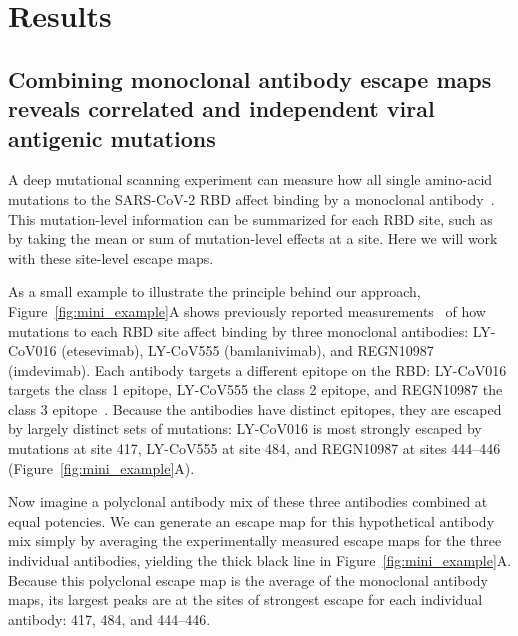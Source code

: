 \documentclass[9pt,twocolumn,twoside]{gsajnl_modified}
\begin{document}
\section{Results}

\subsection{Combining monoclonal antibody escape maps reveals correlated and independent viral antigenic mutations}
A deep mutational scanning experiment can measure how all single amino-acid mutations to the SARS-CoV-2 RBD affect binding by a monoclonal antibody~\citep{greaney2021complete}.
This mutation-level information can be summarized for each RBD site, such as by taking the mean or sum of mutation-level effects at a site.
Here we will work with these site-level escape maps.

As a small example to illustrate the principle behind our approach, Figure~\ref{fig:mini_example}A shows previously reported measurements~\citep{starr2021prospective, starr2021complete} of how mutations to each RBD site affect binding by three monoclonal antibodies: LY-CoV016 (etesevimab), LY-CoV555 (bamlanivimab), and REGN10987 (imdevimab).
Each antibody targets a different epitope on the RBD: LY-CoV016 targets the class 1 epitope, LY-CoV555 the class 2 epitope, and REGN10987 the class 3 epitope~\citep{barnes2020sars,greaney2021mapping}.
Because the antibodies have distinct epitopes, they are escaped by largely distinct sets of mutations: LY-CoV016 is most strongly escaped by mutations at site 417, LY-CoV555 at site 484, and REGN10987 at sites 444--446 (Figure~\ref{fig:mini_example}A).

Now imagine a polyclonal antibody mix of these three antibodies combined at equal potencies.
We can generate an escape map for this hypothetical antibody mix simply by averaging the experimentally measured escape maps for the three individual antibodies, yielding the thick black line in Figure~\ref{fig:mini_example}A.
Because this polyclonal escape map is the average of the monoclonal antibody maps, its largest peaks are at the sites of strongest escape for each individual antibody: 417, 484, and 444--446.
\end{document}
